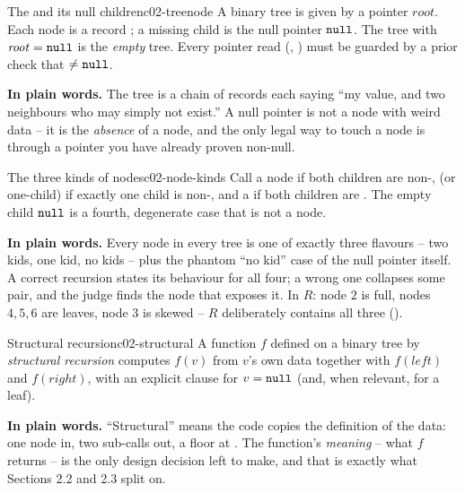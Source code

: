 \begin{definition}{The  and its null children}{c02-treenode}
A binary tree is given by a pointer $\mathit{root}$. Each node is a record
; a missing child is
the null pointer $\texttt{null}$. The tree with $\mathit{root}=\texttt{null}$ is the \emph{empty}
tree. Every pointer read (, ) must be guarded by
a prior check that  $\neq \texttt{null}$.
\end{definition}

\noindent\textbf{In plain words.} The tree is a chain of records each saying ``my
value, and two neighbours who may simply not exist.'' A null pointer is not a
node with weird data -- it is the \emph{absence} of a node, and the only legal way
to touch a node is through a pointer you have already proven non-null.

\begin{definition}{The three kinds of nodes}{c02-node-kinds}
Call a node  if both children are non-\nil{},  (or
one-child) if exactly one child is non-\nil{}, and a  if both children
are \nil{}. The empty child $\texttt{null}$ is a fourth, degenerate case that is not a node.
\end{definition}

\noindent\textbf{In plain words.} Every node in every tree is one of exactly three
flavours -- two kids, one kid, no kids -- plus the phantom ``no kid'' case of the
null pointer itself. A correct recursion states its behaviour for all four; a
wrong one collapses some pair, and the judge finds the node that exposes it. In
$R$: node $2$ is full, nodes $4,5,6$ are leaves, node $3$ is skewed -- $R$
deliberately contains all three ().

\begin{definition}{Structural recursion}{c02-structural}
A function $f$ defined on a binary tree by \emph{structural recursion} computes
$f(v)$ from $v$'s own data together with $f(\mathit{left})$ and
$f(\mathit{right})$, with an explicit clause for $v = \texttt{null}$ (and, when relevant,
for a leaf).
\end{definition}

\noindent\textbf{In plain words.} ``Structural'' means the code copies the
definition of the data: one node in, two sub-calls out, a floor at \nil{}. The
function's \emph{meaning} -- what $f$ returns -- is the only design decision left
to make, and that is exactly what Sections 2.2 and 2.3 split on.


